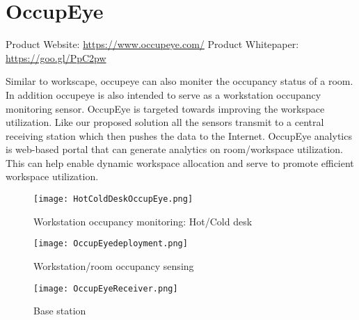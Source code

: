 \section{OccupEye}

Product Website:
\url{https://www.occupeye.com/}
\newline
Product Whitepaper: 
\url{https://goo.gl/PpC2pw}

\vspace{10pt}

Similar to workscape, occupeye can also moniter the occupancy status of a room. In addition occupeye is also intended to serve as a workstation occupancy monitoring sensor.
OccupEye\cite{occupeye} is targeted towards improving the workspace utilization.
Like our proposed solution all the sensors transmit to a central receiving station which then pushes the data to the Internet. OccupEye analytics is web-based portal that can generate analytics on room/workspace utilization. This can help enable dynamic workspace allocation and serve to promote efficient workspace utilization.

\begin{figure}[ht]
\begin{center}
	
\vspace{20pt}
	
\texttt{[image: HotColdDeskOccupEye.png]}
\caption{Workstation occupancy monitoring: Hot/Cold desk}

\vspace{40pt}

\texttt{[image: OccupEyedeployment.png]}
\caption{Workstation/room occupancy sensing}

\vspace{40pt}

\texttt{[image: OccupEyeReceiver.png]}
\caption{Base station}

\end{center}
\end{figure}	